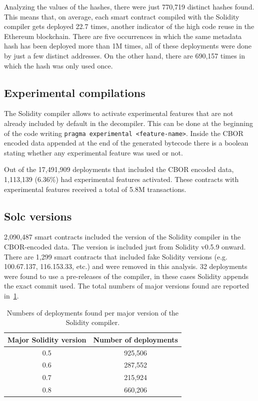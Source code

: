 Analyzing the values of the hashes, there were just 770,719 distinct hashes found. This means that, on average, each smart contract compiled with the Solidity compiler gets deployed 22.7 times, another indicator of the high code reuse in the Ethereum blockchain. There are five occurrences in which the same metadata hash has been deployed more than 1M times, all of these deployments were done by just a few distinct addresses. On the other hand, there are 690,157 times in which the hash was only used once.

\subsection{Experimental compilations}

The Solidity compiler allows to activate experimental features that are not already included by default in the decompiler. This can be done at the beginning of the code writing {\tt pragma experimental <feature-name>}. Inside the CBOR encoded data appended at the end of the generated bytecode there is a boolean stating whether any experimental feature was used or not.

Out of the 17,491,909 deployments that included the CBOR encoded data, 1,113,139 (6.36\%) had experimental features activated. These contracts with experimental features received a total of 5.8M transactions.

\subsection{Solc versions}

2,090,487 smart contracts included the version of the Solidity compiler in the CBOR-encoded data. The version is included just from Solidity v0.5.9 onward. There are 1,299 smart contracts that included fake Solidity versions (e.g. 100.67.137, 116.153.33, etc.) and were removed in this analysis. 32 deployments were found to use a pre-releases of the compiler, in these cases Solidity appends the exact commit used. The total numbers of major versions found are reported in~\cref{table:solc-majors}.

\begin{table}[ht]
\centering
    \begin{threeparttable}
    \begin{tabular}{ c c } 
    \toprule
    \textbf{Major Solidity version} & \textbf{Number of deployments} \\
    \midrule
       0.5 & 925,506 \\ [1.2ex]
       0.6 & 287,552 \\ [1.2ex]
       0.7 & 215,924 \\ [1.2ex]
       0.8 & 660,206 \\ [1.2ex]
    \bottomrule
    \end{tabular}
    \end{threeparttable}
    \caption{Numbers of deployments found per major version of the Solidity compiler.}
    \label{table:solc-majors}
\end{table}

